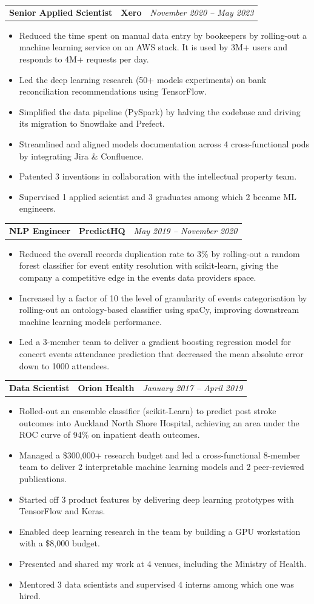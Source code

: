 \documentclass[letterpaper,11pt]{article}
\newcommand{\resumeItem}[1]{
  \item\small{#1 \vspace{-6pt}}
}
\newcommand{\resumeItemListStart}{\begin{itemize}[label=$\circ$, topsep=0.2cm, leftmargin=0.6cm]}
\newcommand{\resumeItemListEnd}{\end{itemize}\vspace{8pt}}
\newcommand{\job}[4]{
    \begin{tabular}{p{7cm}p{6cm}p{5cm}}
      \hspace{-0.7em} \textbf{#1} & \textbf{\small{#2}} & \hfill \textit{\small{#4}}
    \end{tabular}
}
\begin{document}
	\job {Senior Applied Scientist}{Xero}{Auckland}{November 2020 -- May 2023}
      \resumeItemListStart
        \resumeItem {Reduced the time spent on manual data entry by bookeepers by rolling-out a machine learning service on an AWS stack. It is used by 3M+ users and responds to 4M+ requests per day.}
        \resumeItem {Led the deep learning research (50+ models experiments) on bank reconciliation recommendations using TensorFlow.}
        \resumeItem {Simplified the data pipeline (PySpark) by halving the codebase and driving its migration to Snowflake and Prefect.}
        \resumeItem {Streamlined and aligned models documentation across 4 cross-functional pods by integrating Jira \& Confluence.}
        \resumeItem {Patented 3 inventions in collaboration with the intellectual property team.}
        \resumeItem {Supervised 1 applied scientist and 3 graduates among which 2 became ML engineers.}
      \resumeItemListEnd

	\job {NLP Engineer}{PredictHQ}{Auckland}{May 2019 -- November 2020}
      \resumeItemListStart
          \resumeItem {Reduced the overall records duplication rate to 3\% by rolling-out a random forest classifier for event entity resolution with scikit-learn, giving the company a competitive edge in the events data providers space.}
          \resumeItem {Increased by a factor of 10 the level of granularity of events categorisation by rolling-out an ontology-based classifier using spaCy, improving downstream machine learning models performance.}
          \resumeItem {Led a 3-member team to deliver a gradient boosting regression model for concert events attendance prediction that decreased the mean absolute error down to 1000 attendees.}
        \resumeItemListEnd	
	
    \job {Data Scientist}{Orion Health}{Auckland}{January 2017 -- April 2019}
      \resumeItemListStart
        \resumeItem {Rolled-out an ensemble classifier (scikit-Learn) to predict post stroke outcomes into Auckland North Shore Hospital, achieving an area under the ROC curve of 94\% on inpatient death outcomes.}
        \resumeItem {Managed a \$300,000+ research budget and led a cross-functional 8-member team to deliver 2 interpretable machine learning models and 2 peer-reviewed publications.}
        \resumeItem {Started off 3 product features by delivering deep learning prototypes with TensorFlow and Keras.}
        \resumeItem {Enabled deep learning research in the team by building a GPU workstation with a \$8,000 budget.}
        \resumeItem {Presented and shared my work at 4 venues, including the Ministry of Health.}
        \resumeItem {Mentored 3 data scientists and supervised 4 interns among which one was hired.}
      \resumeItemListEnd
\end{document}
